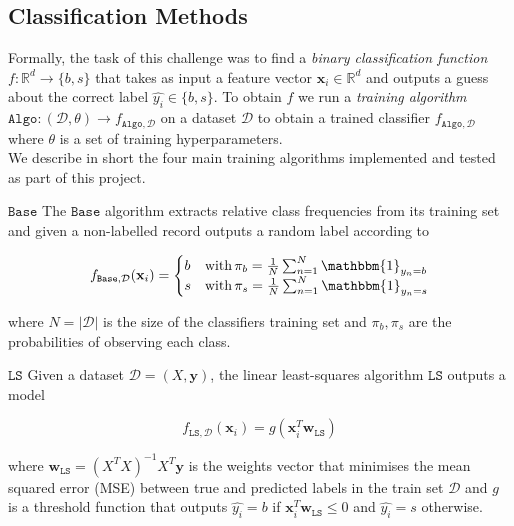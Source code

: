 \documentclass[10pt,conference,compsocconf]{IEEEtran}
\newcommand{\parabf}[1]{\vspace{1mm}\noindent\textbf{#1}}
\newcommand{\Data}{\mathcal{D}}
\newcommand{\features}{\mathbf{x}_i}
\newcommand{\target}{y_i}
\newcommand{\targetset}{\{ b, s \}}
\newcommand{\targetvector}{\mathbf{y}}
\newcommand{\weights}{\mathbf{w}}
\newcommand{\classifier}[2]{f_{#1, #2}}
\newcommand{\Train}{\mathtt{Algo}}
\newcommand{\LeastSquares}{\mathtt{LS}}
\newcommand{\Baseline}{\mathtt{Base}}
\begin{document}
\subsection{Classification Methods}
Formally, the task of this challenge was to find a \emph{binary classification function} $f: \mathbb{R}^d \rightarrow \targetset$ that takes as input a feature vector $\features \in \mathbb{R}^d$ and outputs a guess about the correct label $\hat{\target} \in \targetset$. To obtain $f$ we run a \emph{training algorithm} $\Train: (\Data, \theta) \rightarrow \classifier{\Train}{\Data}$ on a dataset $\Data$ to obtain a trained classifier $\classifier{\Train}{\Data}$ where $\theta$ is a set of training hyperparameters.\\
We describe in short the four main training algorithms implemented and tested as part of this project.

\parabf{$\Baseline$} The $\Baseline$ algorithm extracts relative class frequencies from its training set and given a non-labelled record outputs a random label according to

\vspace*{-2mm}
\begin{equation}
	\classifier{\Baseline}{\Data}(\features) = 
	\begin{cases}
	b &\mbox{with}\,  \pi_b = \frac{1}{N} \sum_{n=1}^N{\mathbbm{1}_{y_n = b}}\\
	s &\mbox{with}\,  \pi_s = \frac{1}{N} \sum_{n=1}^N{\mathbbm{1}_{y_n = s}}
	\end{cases}
\end{equation}

where $N = |\Data|$ is the size of the classifiers training set and $\pi_b, \pi_s$ are the probabilities of observing each class. 

\parabf{$\LeastSquares$} Given a dataset $\Data = (X, \targetvector)$, the linear least-squares algorithm $\LeastSquares$ outputs a model

\vspace*{-4mm}
\begin{equation}
	\classifier{\LeastSquares}{\Data}(\features) = g(\features^T \weights_{\LeastSquares})
\end{equation}

where $\weights_{\LeastSquares} = (X^T X)^{-1}X^T \targetvector$ is the weights vector that minimises the mean squared error (MSE) between true and predicted labels in the train set $\Data$ and $g$ is a threshold function that outputs $\hat{\target} = b$ if $\features^T \weights_{\LeastSquares} \leq 0$ and $\hat{\target} = s$ otherwise.
\end{document}
